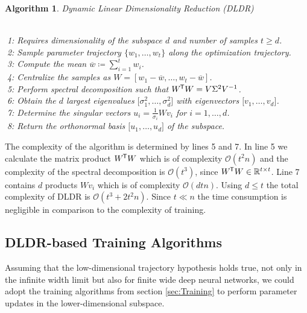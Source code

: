 \documentclass[11pt, a4paper]{article}
\newtheorem{algorithm}[theorem]{Algorithm}
\newcommand{\R}{\mathbb{R}}
\renewcommand{\O}{\mathcal{O}}
\newcommand*{\tr}{^{\mkern-1.5mu\mathsf{T}}}
\begin{document}
\begin{algorithm}
\caption{Dynamic Linear Dimensionality Reduction (DLDR) \textcolor{white}{$\Big |$}} \ \\
\textcolor{white}{$\Big |$}1: Requires dimensionality of the subspace $d$ and number of samples $t \geq d$. \\
\textcolor{white}{$\Big |$}2: Sample parameter trajectory $\{ w_1, \dots, w_t\}$ along the optimization trajectory. \\
\textcolor{white}{$\Big |$}3: Compute the mean $\overline{w} \coloneq \sum_{i=1}^{t} w_i$. \\
\textcolor{white}{$\Big |$}4: Centralize the samples as $W = [w_1-\overline{w}, \dots, w_t - \overline{w}]$. \\
\textcolor{white}{$\Big |$}5: Perform spectral decomposition such that $W\tr W = V \Sigma^2 V^{-1}$.  \\
\textcolor{white}{$\Big |$}6: Obtain the $d$ largest eigenvalues $\big [\sigma_1^2, \dots, \sigma_d^2 \big ]$ with eigenvectors $ \big [v_1, \dots, v_d \big ]$. \\
\textcolor{white}{$\Big |$}7: Determine the singular vectors $u_i = \frac{1}{\sigma_i}Wv_i$ for $i=1, \dots, d$. \\
\textcolor{white}{$\Big |$}8: Return the orthonormal basis $ \big [u_1, \dots, u_d \big ]$ of the subspace.
\end{algorithm}

The complexity of the algorithm is determined by lines 5 and 7. In line 5 we calculate the matrix product $W \tr W$ which is of complexity $\O(t^2n)$ and the complexity of the spectral decomposition is $\O(t^3)$, since $W\tr W \in \R^{t \times t}$. Line 7 contains $d$ products $Wv_i$ which is of complexity $\O(dtn)$. Using $d\leq t$ the total complexity of DLDR is $\O(t^3 + 2t^2n)$. Since $t \ll n$ the time consumption is negligible in comparison to the complexity of training.

\subsection{DLDR-based Training Algorithms}

Assuming that the low-dimensional trajectory hypothesis holds true, not only in the infinite width limit but also for finite wide deep neural networks, we could adopt the training algorithms from section \ref{sec:Training} to perform parameter updates in the lower-dimensional subspace. \\
\end{document}
